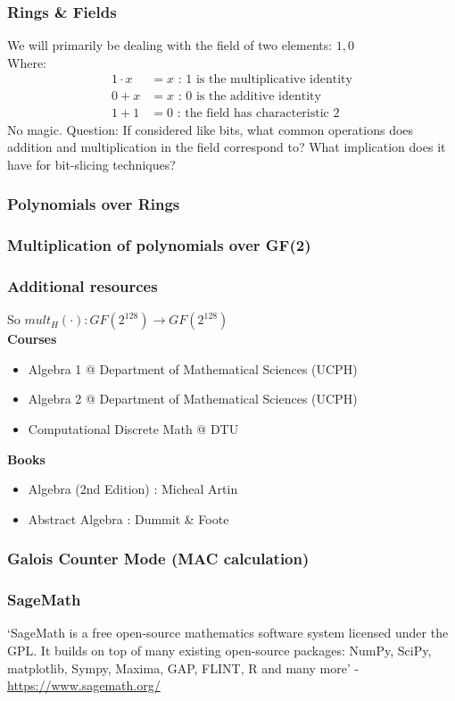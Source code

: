 \documentclass{beamer}
\begin{document}
\begin{frame}
\frametitle{Rings \& Fields}
We will primarily be dealing with the field of two elements:
$1, 0$ \\
Where:
\begin{align}
    1 \cdot x &= x \text{ : 1 is the multiplicative identity} \\
    0 + x     &= x \text{ : 0 is the additive identity} \\
    1 + 1     &= 0 \text{ : the field has characteristic 2}
\end{align}
No magic.
Question:
If considered like bits, what common operations does
addition and multiplication in the field correspond to?
What implication does it have for bit-slicing techniques?
\end{frame}

\begin{frame}
\frametitle{Polynomials over Rings}
\end{frame}

\begin{frame}
\frametitle{Multiplication of polynomials over GF(2)}
\end{frame}

\begin{frame}
\frametitle{Additional resources}
So $mult_{H}(\cdot) : GF(2^{128}) \to GF(2^{128})$ \\
\vspace{3mm}
\textbf{Courses}
\begin{itemize}
    \item Algebra 1 @ Department of Mathematical Sciences (UCPH)
    \item Algebra 2 @ Department of Mathematical Sciences (UCPH)
    \item Computational Discrete Math @ DTU
\end{itemize}
\textbf{Books}
\begin{itemize}
    \item Algebra (2nd Edition) : Micheal Artin
    \item Abstract Algebra : Dummit \& Foote
\end{itemize}
\end{frame}

\begin{frame}
\frametitle{Galois Counter Mode (MAC calculation)}
\end{frame}

\begin{frame}
\frametitle{SageMath}
`SageMath is a free open-source mathematics software system licensed under the GPL.
 It builds on top of many existing open-source packages:
 NumPy, SciPy, matplotlib, Sympy, Maxima, GAP, FLINT, R and many more'
 - \url{https://www.sagemath.org/}
\end{frame}
\end{document}
